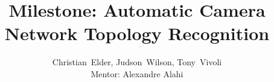 \documentclass[journal]{IEEEtran}
\begin{document}
%
\title{Milestone: Automatic Camera Network Topology Recognition}
%
%
%

\author{Christian~Elder,
	     Judson~Wilson,
	     Tony~Vivoli\\
	     Mentor: Alexandre Alahi}

% 


\maketitle

%






%
\IEEEpeerreviewmaketitle
\end{document}
